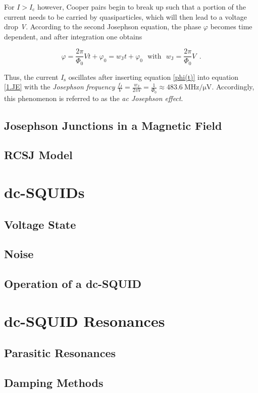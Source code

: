 For $I>I_\mathrm{c}$ however, Cooper pairs begin to break up such that a portion of the current needs to be carried by quasiparticles, which will then lead to a voltage drop \textit{V}. According to the second Josephson equation, the phase $\varphi$ becomes time dependent, and after integration one obtains

\begin{equation}
\label{phi(t)}
\varphi = \frac{2\pi}{\Phi_0}Vt + \varphi_0 = w_\mathrm{J}t + \varphi_0 \ \ \ \mathrm{with} \ \ \ w_\mathrm{J} = \frac{2\pi}{\Phi_0}V \ \ .
\end{equation}

Thus, the current $I_\mathrm{s}$ oscillates after inserting equation \eqref{phi(t)} into equation \eqref{1.JE} with the \textit{Josephson frequency} $\frac{f_\mathrm{J}}{V} = \frac{w_\mathrm{J}}{2\pi V} = \frac{1}{\Phi_0} \approx \SI{483.6}{\MHz\per\uV}$. Accordingly, this phenomenon is referred to as the \textit{ac Josephson effect}.



\subsection{Josephson Junctions in a Magnetic Field}

\Blindtext

\subsection{RCSJ Model}

\section{dc-SQUIDs}

\blindtext[3]

\subsection{Voltage State}

\subsection{Noise}

\subsection{Operation of a dc-SQUID}


\section{dc-SQUID Resonances}

\subsection{Parasitic Resonances}

\subsection{Damping Methods}


